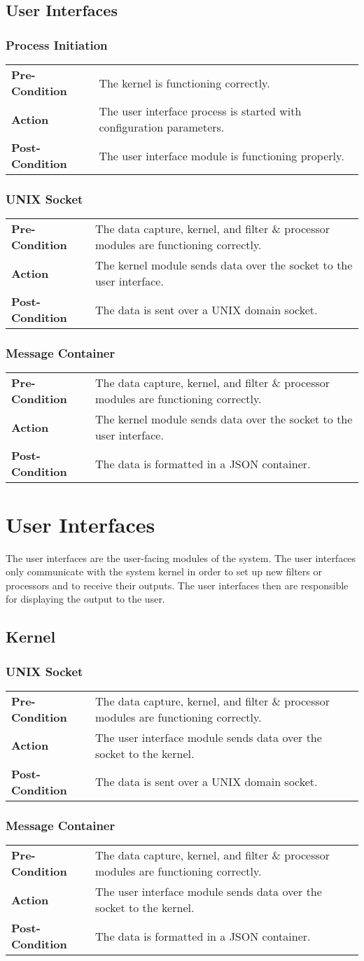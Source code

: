 \documentclass[titlepage]{article}
\newcommand{\testentry}[4]{
    \subsubsection{#1}
    \begin{center}
    \begin{tabular}{| l p{0.7\textwidth}|}
        \hline
        \bf Pre-Condition & #2 \\
        \bf Action & #3 \\
        \bf Post-Condition & #4 \\\hline
    \end{tabular}
    \end{center}
}
\begin{document}

\subsection{User Interfaces}

\testentry{Process Initiation}
    {The kernel is functioning correctly.}
    {The user interface process is started with configuration parameters.}
    {The user interface module is functioning properly.}

\testentry{UNIX Socket}
    {The data capture, kernel, and filter \& processor modules are functioning correctly.}
    {The kernel module sends data over the socket to the user interface.}
    {The data is sent over a UNIX domain socket.}

\testentry{Message Container}
    {The data capture, kernel, and filter \& processor modules are functioning correctly.}
    {The kernel module sends data over the socket to the user interface.}
    {The data is formatted in a JSON container.}


\section{User Interfaces}

The user interfaces are the user-facing modules of the system.  The user interfaces only
communicate with the system kernel in order to set up new filters or processors
and to receive their outputs.  The user interfaces then are responsible for
displaying the output to the user.


\subsection{Kernel}

\testentry{UNIX Socket}
    {The data capture, kernel, and filter \& processor modules are functioning correctly.}
    {The user interface module sends data over the socket to the kernel.}
    {The data is sent over a UNIX domain socket.}

\testentry{Message Container}
    {The data capture, kernel, and filter \& processor modules are functioning correctly.}
    {The user interface module sends data over the socket to the kernel.}
    {The data is formatted in a JSON container.}
\end{document}

